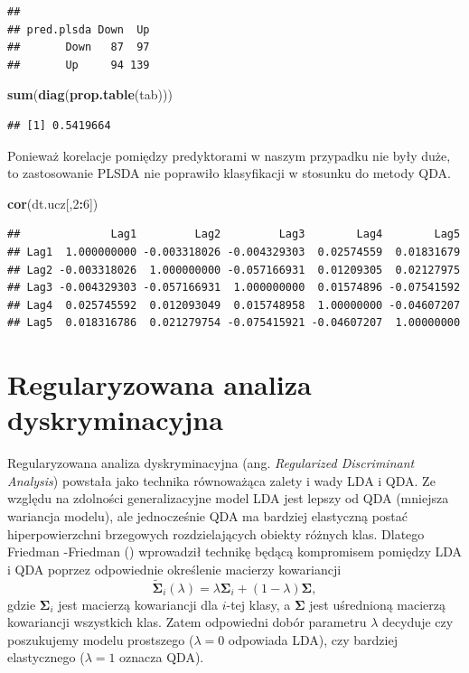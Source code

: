 \documentclass[
]{book}
\newenvironment{Shaded}{\begin{snugshade}}{\end{snugshade}}
\newcommand{\DecValTok}[1]{\textcolor[rgb]{0.00,0.00,0.81}{#1}}
\newcommand{\FunctionTok}[1]{\textcolor[rgb]{0.13,0.29,0.53}{\textbf{#1}}}
\newcommand{\NormalTok}[1]{#1}
\newcommand{\SpecialCharTok}[1]{\textcolor[rgb]{0.81,0.36,0.00}{\textbf{#1}}}
\theoremstyle{plain}
\theoremstyle{definition}
\theoremstyle{definition}
\theoremstyle{definition}
\theoremstyle{definition}
\theoremstyle{definition}
\theoremstyle{remark}
\begin{document}
\begin{verbatim}
##           
## pred.plsda Down  Up
##       Down   87  97
##       Up     94 139
\end{verbatim}

\begin{Shaded}
\begin{Highlighting}[]
\FunctionTok{sum}\NormalTok{(}\FunctionTok{diag}\NormalTok{(}\FunctionTok{prop.table}\NormalTok{(tab)))}
\end{Highlighting}
\end{Shaded}

\begin{verbatim}
## [1] 0.5419664
\end{verbatim}

Ponieważ korelacje pomiędzy predyktorami w naszym przypadku nie były duże, to zastosowanie PLSDA nie poprawiło klasyfikacji w stosunku do metody QDA.

\begin{Shaded}
\begin{Highlighting}[]
\FunctionTok{cor}\NormalTok{(dt.ucz[,}\DecValTok{2}\SpecialCharTok{:}\DecValTok{6}\NormalTok{])}
\end{Highlighting}
\end{Shaded}

\begin{verbatim}
##              Lag1         Lag2         Lag3        Lag4        Lag5
## Lag1  1.000000000 -0.003318026 -0.004329303  0.02574559  0.01831679
## Lag2 -0.003318026  1.000000000 -0.057166931  0.01209305  0.02127975
## Lag3 -0.004329303 -0.057166931  1.000000000  0.01574896 -0.07541592
## Lag4  0.025745592  0.012093049  0.015748958  1.00000000 -0.04607207
## Lag5  0.018316786  0.021279754 -0.075415921 -0.04607207  1.00000000
\end{verbatim}

\section{Regularyzowana analiza dyskryminacyjna}\label{regularyzowana-analiza-dyskryminacyjna}

Regularyzowana analiza dyskryminacyjna (ang. \emph{Regularized Discriminant Analysis}) powstała jako technika równoważąca zalety i wady LDA i QDA. Ze względu na zdolności generalizacyjne model LDA jest lepszy od QDA (mniejsza wariancja modelu), ale jednocześnie QDA ma bardziej elastyczną postać hiperpowierzchni brzegowych rozdzielających obiekty różnych klas. Dlatego Friedman -Friedman () wprowadził technikę będącą kompromisem pomiędzy LDA i QDA poprzez odpowiednie określenie macierzy kowariancji
\begin{equation}
    \tilde{\boldsymbol \Sigma}_i(\lambda) = \lambda\boldsymbol\Sigma_i + (1-\lambda)\boldsymbol\Sigma,
\end{equation}
gdzie \(\boldsymbol \Sigma_i\) jest macierzą kowariancji dla \(i\)-tej klasy, a \(\boldsymbol \Sigma\) jest uśrednioną macierzą kowariancji wszystkich klas. Zatem odpowiedni dobór parametru \(\lambda\) decyduje czy poszukujemy modelu prostszego (\(\lambda = 0\) odpowiada LDA), czy bardziej elastycznego (\(\lambda=1\) oznacza QDA).
\end{document}
